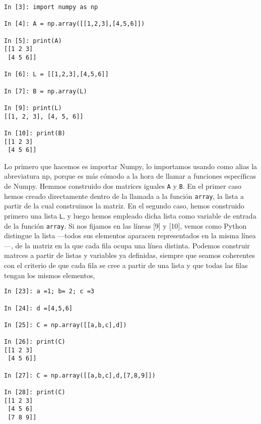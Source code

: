 \begin{center}
    \begin{minipage}{0.4\textwidth}
    \begin{verbatim}
In [3]: import numpy as np

In [4]: A = np.array([[1,2,3],[4,5,6]])

In [5]: print(A)
[[1 2 3]
 [4 5 6]]

In [6]: L = [[1,2,3],[4,5,6]]

In [7]: B = np.array(L)

In [9]: print(L)
[[1, 2, 3], [4, 5, 6]]

In [10]: print(B)
[[1 2 3]
 [4 5 6]]
 \end{verbatim}
\end{minipage}
 \end{center}
\begin{paracol}{2} 
Lo primero que hacemos es importar Numpy, lo importamos usando como alias la abreviatura np, porque es más cómodo a la hora de llamar a funciones específicas de Numpy.  Hemmos construido dos matrices iguales \texttt{A} y \texttt{B}. En el primer caso hemos creado directamente dentro de la llamada a la función \texttt{array}, la lista a partir de la cual construimos la matriz. En el segundo caso, hemos construido primero una lista \texttt{L}, y luego hemos empleado dicha lista como variable de entrada de la función \texttt{array}. Si nos fijamos en las líneas [9] y [10], vemos como Python distingue la lista ---todos sus elementos aparacen representados en la misma línea---, de la matriz en la que cada fila ocupa una línea distinta. Podemos construir matrces a partir de listas y variables ya definidas, siempre que seamos coherentes con el criterio de que cada fila se cree a partir de una lista y que todas las filas tengan los mismos elementos,
\end{paracol}
\begin{center}
    \begin{minipage}{0.4\textwidth}
        \begin{verbatim}
In [23]: a =1; b= 2; c =3

In [24]: d =[4,5,6]

In [25]: C = np.array([[a,b,c],d])

In [26]: print(C)
[[1 2 3]
 [4 5 6]]

In [27]: C = np.array([[a,b,c],d,[7,8,9]])

In [28]: print(C)
[[1 2 3]
 [4 5 6]
 [7 8 9]]
        \end{verbatim}
    \end{minipage}
\end{center}
